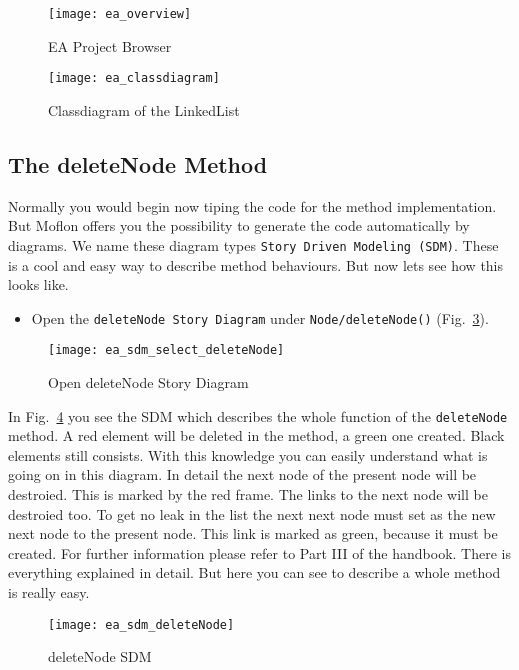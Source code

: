 \begin{figure}[htbp]
	\centering
  \texttt{[image: ea\_overview]}
	\caption{EA Project Browser} 
	\label{ea:overview} 
\end{figure}

\begin{figure}[htbp]
	\centering
  \texttt{[image: ea\_classdiagram]}
	\caption{Classdiagram of the LinkedList} 
	\label{ea:classdiagram} 
\end{figure}





\subsection{The deleteNode Method}
Normally you would begin now tiping the code for the method implementation. But Moflon offers you the possibility to generate the code automatically by diagrams. We name these diagram types \texttt{Story Driven Modeling (SDM)}. These is a cool and easy way to describe method behaviours. But now lets see how this looks like.

\begin{itemize}
\item Open the \texttt{deleteNode Story Diagram} under \texttt{Node/deleteNode()} \newline (Fig.~\ref{open_deleteNode}).
\end{itemize}
\begin{figure}[htbp]
	\centering
  \texttt{[image: ea\_sdm\_select\_deleteNode]}
	\caption{Open deleteNode Story Diagram} 
	\label{open_deleteNode} 
\end{figure}

In Fig.~\ref{sdm_deleteNode} you see the SDM which describes the whole function of the \texttt{deleteNode} method. A red element will be deleted in the method, a green one created. Black elements still consists. With this knowledge you can easily understand what is going on in this diagram.
\newline
In detail the next node of the present node will be destroied. This is marked by the red frame. The links to the next node will be destroied too. To get no leak in the list the next next node must set as the new next node to the present node. This link is marked as green, because it must be created. 
\newline
For further information please refer to Part III of the handbook. There is everything explained in detail. But here you can see to describe a whole method is really easy.

\begin{figure}[htbp]
	\centering
  \texttt{[image: ea\_sdm\_deleteNode]}
	\caption{deleteNode SDM} 
	\label{sdm_deleteNode} 
\end{figure}



